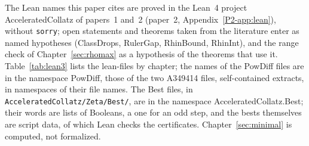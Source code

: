 \documentclass[10pt,a4paper,titlepage]{article}
\newcommand{\lean}[1]{\textsf{#1}}
\begin{document}
The Lean names this paper cites are proved in the Lean~4 project \lean{AcceleratedCollatz}
of papers~1 and~2 (paper~2, Appendix~\ref{P2-app:lean}), without \texttt{sorry}; open
statements and theorems taken from the literature enter as named hypotheses
(\lean{ClassDrops}, \lean{RulerGap}, \lean{RhinBound}, \lean{RhinInt}), and the range check of
Chapter~\ref{sec:rhomax} as a hypothesis of the theorems that use it. Table~\ref{tab:lean3} lists the
lean-files by chapter; the names of the \lean{PowDiff} files are in the namespace \lean{PowDiff},
those of the two \lean{A349414} files, self-contained extracts, in namespaces of their file names. The \lean{Best} files, in \texttt{AcceleratedCollatz/Zeta/Best/}, are in the namespace \lean{AcceleratedCollatz.Best}; their words are lists of Booleans, a one for an odd step, and the bests themselves are script data, of which Lean checks the certificates. Chapter~\ref{sec:minimal} is computed, not formalized.
\end{document}
